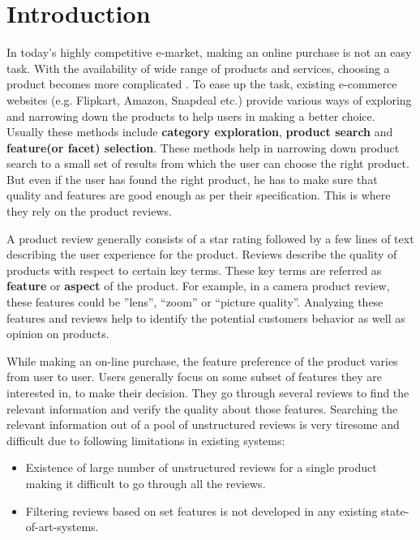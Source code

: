 \section{Introduction}\label{sec:introduction}

In today's highly competitive e-market, making an online purchase is not an easy task. With the availability of wide range of products and services, choosing a product becomes  more complicated .  To ease up the task, existing e-commerce websites (e.g. Flipkart, Amazon, Snapdeal etc.) provide various ways of exploring and narrowing down the products to help users in making a better choice. Usually these methods include \textbf{category exploration}, \textbf{product search} and \textbf{feature(or facet) selection}. These methods help in narrowing down product search to a small set of results from which the user can choose the right product. But even if the user has found the right product, he has to make sure that quality and features are good enough as per their specification. This is where they rely on the product reviews. 

A product review generally consists of a star rating followed by a few lines of text describing the user experience for the product. Reviews describe the quality of products with respect to certain key terms. These key terms are referred as \textbf{feature} or \textbf{aspect} of the product. For example, in a camera product review, these features could be ”lens”, “zoom” or “picture quality”. Analyzing these features and reviews help to identify the potential customers behavior as well as opinion on products.

While making an on-line purchase, the feature preference of the product varies from user to user. Users generally focus on some subset of features they are interested in, to make their decision. They go through several reviews to find the relevant information and verify the quality about those features. Searching the relevant information out of a pool of unstructured reviews is very tiresome and difficult due to following limitations in existing systems:
\begin{itemize}
	\item
	Existence of large number of unstructured reviews for a single product making it difficult to go through all the reviews.
	\item Filtering reviews based on set features is not developed in any existing state-of-art-systems.
\end{itemize}


